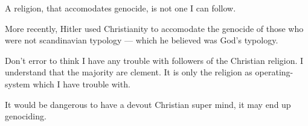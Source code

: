 A religion, that accomodates genocide, is not one I can follow.

More recently, Hitler used Christianity\cite{christianhitler} to accomodate 
the genocide of those who were not scandinavian typology --- which he believed
was God's typology.

Don't error to think I have any trouble with followers of the Christian
religion. I understand that the majority are clement. It is only the religion as
operating-system which I have trouble with.

It would be dangerous to have a devout Christian super mind,
it may end up genociding.
